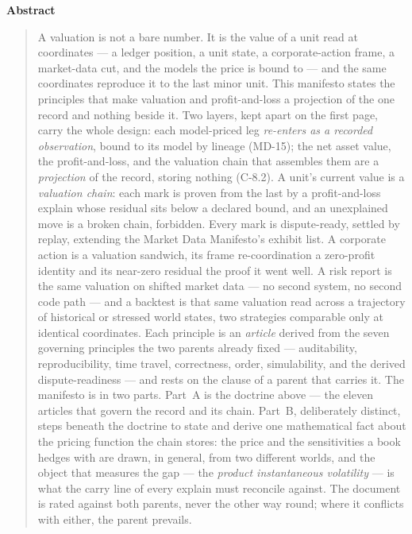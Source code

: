 \documentclass[11pt,a4paper]{article}
\begin{document}
\begin{center}\textbf{Abstract}\end{center}
\begin{quote}
A valuation is not a bare number. It is the value of a unit read at
coordinates --- a ledger position, a unit state, a corporate-action
frame, a market-data cut, and the models the price is bound to --- and
the same coordinates reproduce it to the last minor unit. This manifesto
states the principles that make valuation and profit-and-loss a
projection of the one record and nothing beside it. Two layers, kept
apart on the first page, carry the whole design: each model-priced leg
\emph{re-enters as a recorded observation}, bound to its model by
lineage (MD-15); the net asset value, the profit-and-loss, and the
valuation chain that assembles them are a \emph{projection} of the record,
storing
nothing (C-8.2). A unit's current value is a \emph{valuation chain}: each
mark is proven from the last by a profit-and-loss explain whose residual
sits below a declared bound, and an unexplained move is a broken chain,
forbidden. Every mark is dispute-ready, settled by replay, extending the
Market Data Manifesto's exhibit list. A corporate action is a valuation
sandwich, its frame re-coordination a zero-profit identity and its
near-zero residual the proof it went well. A risk report is the same
valuation on shifted market data --- no second system, no second code
path --- and a backtest is that same valuation read across a trajectory of
historical or stressed world states, two strategies comparable only at
identical coordinates. Each principle is an \emph{article} derived from the seven governing
principles the two parents already fixed --- auditability, reproducibility,
time travel, correctness, order, simulability, and the derived
dispute-readiness --- and rests on the clause of a parent that carries it.
The manifesto is in two parts. Part~A is the doctrine above --- the eleven
articles that govern the record and its chain. Part~B, deliberately
distinct, steps beneath the doctrine to state and derive one mathematical
fact about the pricing function the chain stores: the price and the
sensitivities a book hedges with are drawn, in general, from two different
worlds, and the object that measures the gap --- the \emph{product
instantaneous volatility} --- is what the carry line of every explain must
reconcile against.
The document is rated against both parents, never the other way round;
where it conflicts with either, the parent prevails.
\end{quote}
\end{document}
